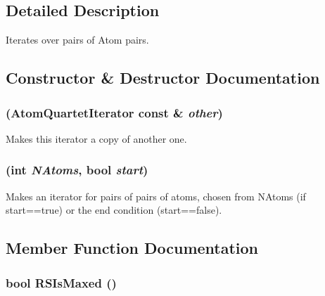 \subsection{Detailed Description}
Iterates over pairs of Atom pairs. 

\subsection{Constructor \& Destructor Documentation}
\hypertarget{classJKBuilder_1_1AtomQuartetIterator_ab6c4f20fcdd55b5e65bd25fd0ffa6aab}{
\subsubsection[{AtomQuartetIterator}]{ ({\bf AtomQuartetIterator} const \& {\em other})}}
\label{classJKBuilder_1_1AtomQuartetIterator_ab6c4f20fcdd55b5e65bd25fd0ffa6aab}


Makes this iterator a copy of another one. \hypertarget{classJKBuilder_1_1AtomQuartetIterator_a9cf8914af3c8623ae212e03307e27195}{
\subsubsection[{AtomQuartetIterator}]{ (int {\em NAtoms}, \/  bool {\em start})}}
\label{classJKBuilder_1_1AtomQuartetIterator_a9cf8914af3c8623ae212e03307e27195}


Makes an iterator for pairs of pairs of atoms, chosen from NAtoms (if start==true) or the end condition (start==false). 

\subsection{Member Function Documentation}
\hypertarget{classJKBuilder_1_1AtomQuartetIterator_a458dcf49c4c4bbb1e3d3d39d3dc086c9}{
\subsubsection[{RSIsMaxed}]{\setlength{\rightskip}{0pt plus 5cm}bool RSIsMaxed ()}}
\label{classJKBuilder_1_1AtomQuartetIterator_a458dcf49c4c4bbb1e3d3d39d3dc086c9}


